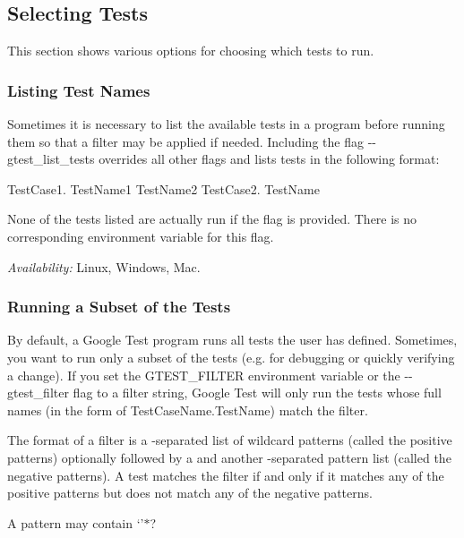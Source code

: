 \subsection*{Selecting Tests}

This section shows various options for choosing which tests to run.

\subsubsection*{Listing Test Names}

Sometimes it is necessary to list the available tests in a program before running them so that a filter may be applied if needed. Including the flag {\ttfamily -\/-\/gtest\+\_\+list\+\_\+tests} overrides all other flags and lists tests in the following format\+: 
\begin{DoxyCode}
TestCase1.
  TestName1
  TestName2
TestCase2.
  TestName
\end{DoxyCode}


None of the tests listed are actually run if the flag is provided. There is no corresponding environment variable for this flag.

{\itshape Availability\+:} Linux, Windows, Mac.

\subsubsection*{Running a Subset of the Tests}

By default, a Google Test program runs all tests the user has defined. Sometimes, you want to run only a subset of the tests (e.\+g. for debugging or quickly verifying a change). If you set the {\ttfamily G\+T\+E\+S\+T\+\_\+\+F\+I\+L\+T\+ER} environment variable or the {\ttfamily -\/-\/gtest\+\_\+filter} flag to a filter string, Google Test will only run the tests whose full names (in the form of {\ttfamily Test\+Case\+Name.\+Test\+Name}) match the filter.

The format of a filter is a \textquotesingle{}{\ttfamily \+:}\textquotesingle{}-\/separated list of wildcard patterns (called the positive patterns) optionally followed by a \textquotesingle{}{\ttfamily -\/}\textquotesingle{} and another \textquotesingle{}{\ttfamily \+:}\textquotesingle{}-\/separated pattern list (called the negative patterns). A test matches the filter if and only if it matches any of the positive patterns but does not match any of the negative patterns.

A pattern may contain `'$\ast$\textquotesingle{}?

